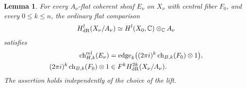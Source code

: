 \documentclass[11pt]{article}
\newcommand{\C}{\mathbb C}
\newtheorem{lemma}[theorem]{Lemma}
\numberwithin{equation}{section}
\begin{document}
\begin{lemma}
\label{p3sw:bf-artin-character}
For every \(A_\nu\)-flat coherent sheaf \(E_\nu\) on \(X_\nu\)
with central fiber \(F_0\), and every \(0\leq k\leq n\), the ordinary flat comparison
\[
 H^l_{\rm dR}(X_\nu/A_\nu)
       \simeq H^l(X_0,\C)\otimes_\C A_\nu
\]
satisfies
\begin{equation}
\label{p3sw:bf-artin-character-formula}
 \begin{split}
 \operatorname{ch}^{\rm rel}_{H,k}(E_\nu)
 &=\operatorname{edge}_k\bigl((2\pi i)^k
                 \operatorname{ch}_{B,k}(F_0)\otimes1\bigr),\\
 (2\pi i)^k\operatorname{ch}_{B,k}(F_0)\otimes1
 &\in F^kH^{2k}_{\rm dR}(X_\nu/A_\nu).
 \end{split}
\end{equation}
The assertion holds independently of the choice of the lift.
\end{lemma}
\end{document}
